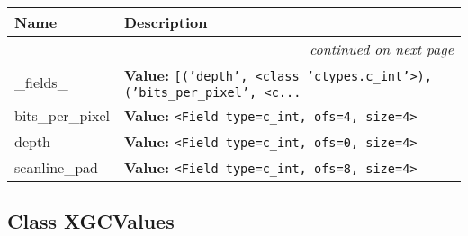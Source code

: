     \vspace{-1cm}
\hspace{\varindent}\begin{longtable}{|p{\varnamewidth}|p{\vardescrwidth}|l}
\cline{1-2}
\cline{1-2} \centering \textbf{Name} & \centering \textbf{Description}& \\
\cline{1-2}
\endhead\cline{1-2}\multicolumn{3}{r}{\small\textit{continued on next page}}\\\endfoot\cline{1-2}
\endlastfoot\raggedright \_\-f\-i\-e\-l\-d\-s\-\_\- & \raggedright \textbf{Value:} 
{\tt \texttt{[}\texttt{(}\texttt{'}\texttt{depth}\texttt{'}\texttt{, }{\textless}class 'ctypes.c\_int'{\textgreater}\texttt{)}\texttt{, }\texttt{(}\texttt{'}\texttt{bits\_per\_pixel}\texttt{'}\texttt{, }{\textless}c\texttt{...}}&\\
\cline{1-2}
\raggedright b\-i\-t\-s\-\_\-p\-e\-r\-\_\-p\-i\-x\-e\-l\- & \raggedright \textbf{Value:} 
{\tt {\textless}Field type=c\_int, ofs=4, size=4{\textgreater}}&\\
\cline{1-2}
\raggedright d\-e\-p\-t\-h\- & \raggedright \textbf{Value:} 
{\tt {\textless}Field type=c\_int, ofs=0, size=4{\textgreater}}&\\
\cline{1-2}
\raggedright s\-c\-a\-n\-l\-i\-n\-e\-\_\-p\-a\-d\- & \raggedright \textbf{Value:} 
{\tt {\textless}Field type=c\_int, ofs=8, size=4{\textgreater}}&\\
\cline{1-2}
\end{longtable}



\subsection{Class XGCValues}

